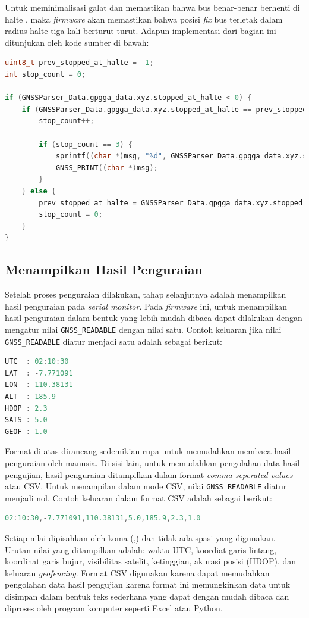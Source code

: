 Untuk meminimalisasi galat dan memastikan bahwa bus benar-benar berhenti di halte , maka \textit{firmware} akan memastikan bahwa posisi \textit{fix} bus terletak dalam radius halte tiga kali berturut-turut. Adapun implementasi dari bagian ini ditunjukan oleh kode sumber di bawah:

\begin{lstlisting}[language=c]
uint8_t prev_stopped_at_halte = -1;
int stop_count = 0; 

if (GNSSParser_Data.gpgga_data.xyz.stopped_at_halte < 0) {
	if (GNSSParser_Data.gpgga_data.xyz.stopped_at_halte == prev_stopped_at_halte) {
		stop_count++; 
		
		if (stop_count == 3) { 
			sprintf((char *)msg, "%d", GNSSParser_Data.gpgga_data.xyz.stopped_at_halte);
			GNSS_PRINT((char *)msg);
		}
	} else {
		prev_stopped_at_halte = GNSSParser_Data.gpgga_data.xyz.stopped_at_halte;
		stop_count = 0; 
	}
}
\end{lstlisting}
\fi
\subsection{Menampilkan Hasil Penguraian}
Setelah proses penguraian dilakukan, tahap selanjutnya adalah menampilkan hasil penguraian pada \textit{serial monitor}. Pada \textit{firmware} ini, untuk menampilkan hasil penguraian dalam bentuk yang lebih mudah dibaca dapat dilakukan dengan mengatur nilai \texttt{GNSS\_READABLE} dengan nilai satu. Contoh keluaran jika nilai \texttt{GNSS\_READABLE} diatur menjadi satu adalah sebagai berikut:
\begin{lstlisting}[language=c]
UTC  : 02:10:30
LAT  : -7.771091
LON  : 110.38131
ALT  : 185.9
HDOP : 2.3
SATS : 5.0
GEOF : 1.0
\end{lstlisting}

Format di atas dirancang sedemikian rupa untuk memudahkan membaca hasil penguraian oleh manusia. Di sisi lain, untuk memudahkan pengolahan data hasil pengujian, hasil penguraian ditampilkan dalam format \textit{comma seperated values} atau CSV. Untuk menampilan dalam mode CSV, nilai \texttt{GNSS\_READABLE} diatur menjadi nol. Contoh keluaran dalam format CSV adalah sebagai berikut:

\begin{lstlisting}[language=c]
02:10:30,-7.771091,110.38131,5.0,185.9,2.3,1.0
\end{lstlisting}

Setiap nilai dipisahkan oleh koma (,) dan tidak ada spasi yang digunakan. Urutan nilai yang ditampilkan adalah: waktu UTC, koordiat garis lintang, koordinat garis bujur, visibilitas satelit, ketinggian, akurasi posisi (HDOP), dan keluaran \textit{geofencing}. Format CSV digunakan karena dapat memudahkan pengolahan data hasil pengujian karena format ini memungkinkan data untuk disimpan dalam bentuk teks sederhana yang dapat dengan mudah dibaca dan diproses oleh program komputer seperti Excel atau Python.

